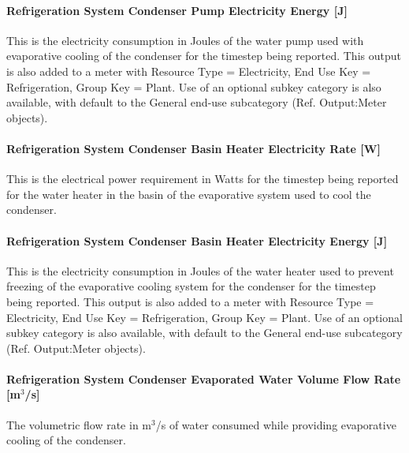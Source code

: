 \paragraph{Refrigeration System Condenser Pump Electricity Energy {[}J{]}}\label{refrigeration-system-condenser-pump-electric-energy-j}

This is the electricity consumption in Joules of the water pump used with evaporative cooling of the condenser for the timestep being reported. This output is also added to a meter with Resource Type = Electricity, End Use Key = Refrigeration, Group Key = Plant. Use of an optional subkey category is also available, with default to the General end-use subcategory (Ref. Output:Meter objects).

\paragraph{Refrigeration System Condenser Basin Heater Electricity Rate {[}W{]}}\label{refrigeration-system-condenser-basin-heater-electric-power-w}

This is the electrical power requirement in Watts for the timestep being reported for the water heater in the basin of the evaporative system used to cool the condenser.

\paragraph{Refrigeration System Condenser Basin Heater Electricity Energy {[}J{]}}\label{refrigeration-system-condenser-basin-heater-electric-energy-j}

This is the electricity consumption in Joules of the water heater used to prevent freezing of the evaporative cooling system for the condenser for the timestep being reported. This output is also added to a meter with Resource Type = Electricity, End Use Key = Refrigeration, Group Key = Plant. Use of an optional subkey category is also available, with default to the General end-use subcategory (Ref. Output:Meter objects).

\paragraph{Refrigeration System Condenser Evaporated Water Volume Flow Rate {[}m\(^{3}\)/s{]}}\label{refrigeration-system-condenser-evaporated-water-volume-flow-rate-m3s}

The volumetric flow rate in m\(^{3}\)/s of water consumed while providing evaporative cooling of the condenser.


